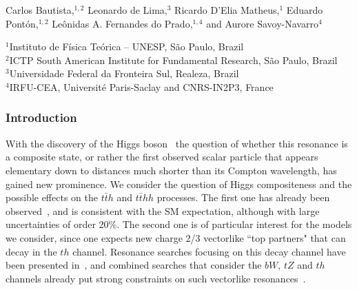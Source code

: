 \medskip
\begin{center}
{Carlos Bautista,$^{1,2}$ Leonardo de Lima,$^3$ Ricardo D'Elia Matheus,$^1$ Eduardo Pont\'on,$^{1,2}$ Le\^onidas A. Fernandes do Prado,$^{1,4}$ and Aurore Savoy-Navarro$^4$}

{\small 
$^1$Instituto de F\'isica Te\'orica -- UNESP, S\~ao Paulo, Brazil \\
$^2$ICTP South American Institute for Fundamental Research, S\~ao Paulo, Brazil \\
$^3$Universidade Federal da Fronteira Sul, Realeza, Brazil \\
$^4$IRFU-CEA, Universit\'e Paris-Saclay and CNRS-IN2P3, France}
\end{center}
\subsubsection{Introduction}

With the discovery of the Higgs boson~\cite{Aad:2012tfa,
Chatrchyan:2012xdj} the question of whether this resonance is a
composite state, or rather the first observed scalar particle that
appears elementary down to distances much shorter than its Compton
wavelength, has gained new prominence.  We consider the question of
Higgs compositeness and the possible effects on the $t\bar{t}h$ and
$t\bar{t}  h h$ processes.  The first one has already been
observed~\cite{Aaboud:2018urx, Sirunyan:2018hoz}, and is consistent
with the SM expectation, although with large uncertainties of order
20\%.  The second one is of particular interest for the models we
consider, since one expects new charge 2/3 vectorlike ``top partners"
that can decay in the $th$ channel.  Resonance searches focusing on
this decay channel have been presented in~\cite{Aaboud:2018xuw}, and
combined searches that consider the $bW$, $tZ$ and $th$ channels
already put strong constraints on such vectorlike
resonances~\cite{Aaboud:2018pii, Sirunyan:2018omb}.

